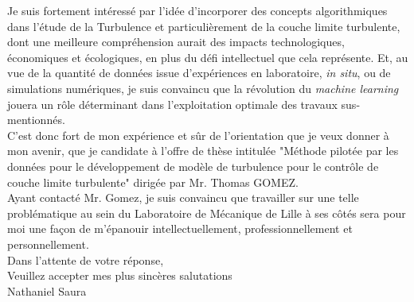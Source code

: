 \documentclass[french, lmr]{article}
\begin{document}
Je suis fortement intéressé par l'idée d'incorporer des concepts algorithmiques dans l'étude de la Turbulence et particulièrement de la couche limite turbulente, dont une meilleure compréhension aurait des impacts technologiques, économiques et écologiques, en plus du défi intellectuel que cela représente. Et, au vue de la quantité de données issue d'expériences en laboratoire, \textit{in situ}, ou de simulations numériques, je suis convaincu que la révolution du \textit{machine learning} jouera un rôle déterminant dans l'exploitation optimale des travaux sus-mentionnés.\\
C'est donc fort de mon expérience et sûr de l'orientation que je veux donner à mon avenir, que je candidate à l'offre de thèse intitulée "Méthode pilotée par les données pour le développement de modèle de turbulence pour le contrôle de couche limite turbulente" dirigée par Mr. Thomas \textsc{GOMEZ}. \\
Ayant contacté Mr. Gomez, je suis convaincu que travailler sur une telle problématique au sein du Laboratoire de Mécanique de Lille à ses côtés sera pour moi une façon de m'épanouir intellectuellement, professionnellement et personnellement. 
\\[2mm] 

\raggedleft \small
Dans l'attente de votre réponse, \\
Veuillez accepter mes plus sincères salutations \\
Nathaniel Saura
\end{document}
